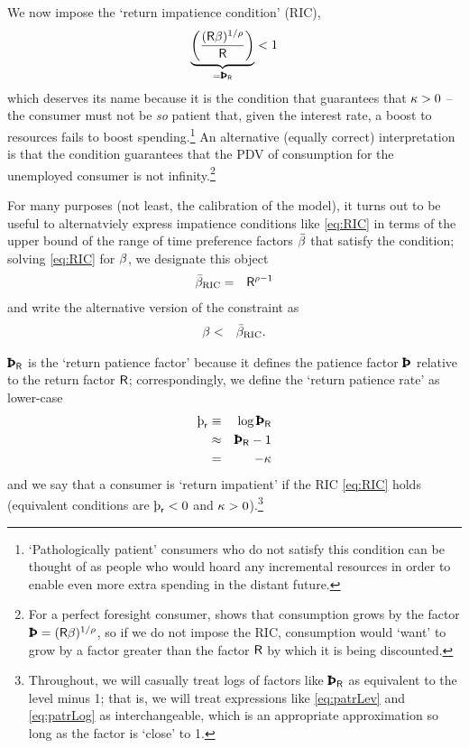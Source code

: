 \documentclass{handout}
\begin{document}
\indent We now impose the `return impatience condition' (RIC),
\begin{eqnarray}
  \underbrace{\left(\frac{(\Rfree \Discount)^{1/\CRRA}}{\Rfree}\right)}_{= \PatR} < 1 \label{eq:RIC}
\end{eqnarray}
which deserves its name because it is the condition that guarantees that $\kappa
> 0$ -- the consumer must not be {\it so} patient that, given the interest rate, a boost to
resources fails to boost spending.\footnote{`Pathologically patient' consumers who do not satisfy this condition can be thought of as people who would hoard any incremental resources in order to enable even more extra spending in the distant future.}
An alternative (equally correct)
interpretation is that the condition guarantees that the PDV of
consumption for the unemployed consumer is not infinity.\footnote{For a perfect
foresight consumer,  shows that consumption grows by the factor
$\Pat = (\Rfree\Discount)^{1/\CRRA}$, so if we do not impose the RIC, consumption would `want' to grow by
a factor greater than the factor $\mathsf{R}$ by which it is being
discounted.}  

For many purposes (not least, the calibration of the model), it turns out to be useful to alternatviely express
impatience conditions like \eqref{eq:RIC} in terms of the upper bound of the range of time preference
factors $\bar{\beta}$ that satisfy the condition; solving \eqref{eq:RIC} for $\beta$, we designate this 
object \providecommand{\DiscountMaxRIC}{\ensuremath{\bar{\Discount}_{\text{RIC}}}}
\begin{eqnarray}
  \DiscountMaxRIC & = & \Rfree^{\CRRA-1}
\end{eqnarray}
and write the alternative version of the constraint as 
\begin{eqnarray}
  \Discount & < & \DiscountMaxRIC \label{eq:DiscountMaxRIC}.
\end{eqnarray}

$\PatR$ is the `return patience factor' because it defines the patience factor $\Pat$
relative to the return factor $\mathsf{R}$; correspondingly, we define the `return
patience rate' as lower-case
\begin{eqnarray}
   \patr & \equiv &  \log \PatR \label{eq:patrLog}
\\ & \approx &\PatR - 1 \label{eq:patrLev}
\\ & = & -\MPCU
\end{eqnarray}
and we say that a consumer is `return impatient' if the RIC \eqref{eq:RIC} holds (equivalent conditions are $\patr < 0$ and $\kappa > 0$).\footnote{Throughout, we will casually treat logs of factors like $\PatR$ as equivalent to the level minus 1; that is, we will treat expressions like \eqref{eq:patrLev} and \eqref{eq:patrLog} as interchangeable, which is an appropriate approximation so long as the factor is `close' to 1.}
\end{document}
